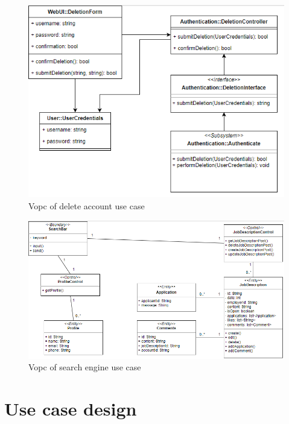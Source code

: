 \documentclass[a4paper]{article}
\begin{document}
    \begin{figure}[H]
        \centering
        \includegraphics[width=1.0\textwidth]{vopc_delacc.png}
        \caption{Vopc of delete account use case}
        \label{fig:fig30}
    \end{figure}

    \begin{figure}[H]
        \centering
        \includegraphics[width=1.0\textwidth]{vopc_search_engine.png}
        \caption{Vopc of search engine use case}
        \label{fig:fig31}
    \end{figure}

\section{Use case design}
\end{document}
